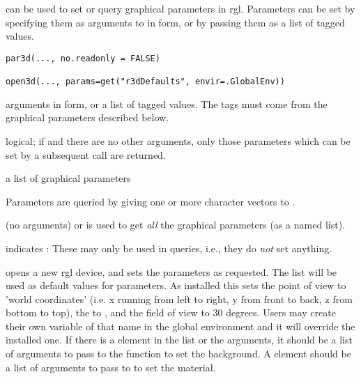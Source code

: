 \documentclass{article}
\begin{document}
\begin{Description}\relax
{} can be used to set or query graphical parameters in rgl.
Parameters can be set by specifying them as arguments to  in
 form, or by passing them as a list of tagged
values.
\end{Description}
\begin{Usage}
\begin{verbatim}
par3d(..., no.readonly = FALSE)

open3d(..., params=get("r3dDefaults", envir=.GlobalEnv))

\end{verbatim}
\end{Usage}
\begin{Arguments}
\begin{ldescription}
\item[\code{...}] arguments in  form, or a list of tagged
values.  The tags must come from the graphical parameters described
below.
\item[\code{no.readonly}] logical; if  and there are no other
arguments, only those parameters which can be set by a
subsequent  call are returned.
\item[\code{params}] a list of graphical parameters
\end{ldescription}
\end{Arguments}
\begin{Details}\relax
Parameters are queried by giving one or more character vectors to
.

 (no arguments) or  is used to
get \emph{all} the graphical parameters (as a named list).  

\emph{} indicates \emph{}: These
may only be used in queries, i.e., they do \emph{not} set anything.

 opens a new rgl device, and sets the parameters as
requested.  The  list will be used as default
values for parameters.  As installed this sets the point of view to
'world coordinates' (i.e. x running from left to right, y from front
to back, z from bottom to top), the  to
, and the field of view to 30 degrees.
Users may create their own variable of that name in the global
environment and it will override the installed one.  If there
is a  element in the list or the arguments, it should be
a list of arguments to pass to the  function to 
set the background.  A  element should be a list
of arguments to pass to  to set the material.
\end{Details}
\end{document}
